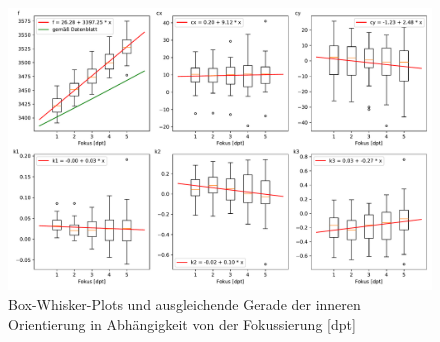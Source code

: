 \documentclass[./00PhotoBox.tex]{subfiles}
\begin{document}
\begin{figure}
    \centering
    \includegraphics[width=1\textwidth]{./img/naeherungswerte_diagramm.pdf}
    \caption{Box-Whisker-Plots und ausgleichende Gerade der inneren Orientierung in Abhängigkeit von der Fokussierung [dpt]} %
    \label{img:naeherungswerte} %
\end{figure}




\biblio
\end{document}

